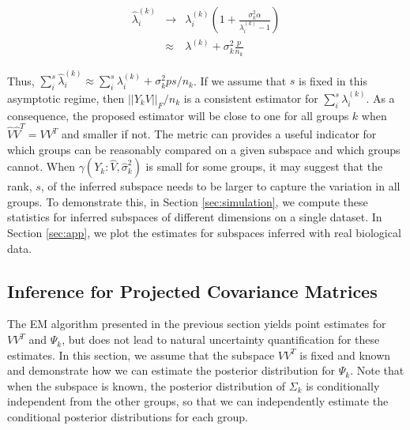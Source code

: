 \documentclass[12pt]{article}
\begin{document}
\begin{eqnarray}
\nonumber \hat{\lambda}^{(k)}_i &\rightarrow& \lambda^{(k)}_i\left(1 +
                                    \frac{\sigma_k^2\alpha}{\lambda^{(k)}_i
                                    - 1}\right)\\
& \approx& \lambda^{(k)} + \sigma^2_k\frac{p}{n_k}
\end{eqnarray}

Thus,
$\sum_i^s \hat{\lambda}^{(k)}_i \approx \sum_i^s \lambda^{(k)}_i +
\sigma_k^2ps/n_k$.
If we assume that $s$ is fixed in this asymptotic regime, then
$||Y_kV||_F/n_k$ is a consistent estimator for
$\sum_i^s \lambda^{(k)}_i$.  As a consequence, the proposed estimator
will be close to one for all groups $k$ when $\hat{V}\hat{V}^T = VV^T$
and smaller if not.  The metric can provides a useful indicator for
which groups can be reasonably compared on a given subspace and which
groups cannot.  When $\gamma(Y_k: \hat{V}, \hat{\sigma}_k^2)$ is small
for some groups, it may suggest that the rank, $s$, of the inferred
subspace needs to be larger to capture the variation in all groups. To
demonstrate this, in Section \ref{sec:simulation}, we compute these
statistics for inferred subspaces of different dimensions on a single
dataset. In Section \ref{sec:app}, we plot the estimates for subspaces
inferred with real biological data.


\subsection{Inference for Projected Covariance Matrices}
\label{sec:bayes}

The EM algorithm presented in the previous section yields point
estimates for $VV^T$ and $\Psi_k$, but does not lead to natural
uncertainty quantification for these estimates.  In this section, we
assume that the subspace $VV^T$ is fixed and known and demonstrate how
we can estimate the posterior distribution for $\Psi_k$.   Note that when
the subspace is known, the posterior distribution of $\Sigma_k$ is
conditionally independent from the other groups, so that we can
independently estimate the conditional posterior distributions for each
group.

\end{document}
